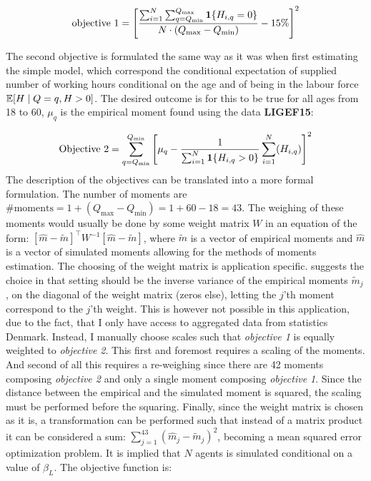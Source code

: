 \begin{equation}
    \text{objective 1} = \left[\frac{\sum_{i=1}^{N} \sum_{q=Q_{\min}}^{Q_{\max}} \mathbf{1}\{H_{i,q} = 0\}}{ N \cdot (Q_{\max} - Q_{\min} )} - 15\% \right]^2
\end{equation}

The second objective is formulated the same way as it was when first estimating the simple model, which correspond the conditional expectation of supplied number of working hours conditional on the age and of being in the labour force $ \mathbb{E}[H \mid Q=q, H>0]$. The desired outcome is for this to be true for all ages from 18 to 60, $\mu_q$ is the empirical moment found using the data \textbf{LIGEF15}:

\begin{equation}
    \text{Objective 2} = \sum_{q=Q_{\min}}^{Q_{\min}} \left[ \mu_q  - \frac{1}{\sum_{i=1}^{N} \mathbf{1}\{H_{i,q} > 0\}}\sum_{i=1}^N (H_{i,q})\right]^2
\end{equation}
The description of the objectives can be translated into a more formal formulation. The number of moments are $\text{\# moments}  = 1 + (Q_{\max} - Q_{\min}) = 1 + 60 - 18 = 43$. The weighing of these moments would usually be done by some weight matrix $W$ in an equation of the form: $[\hat{m} - \tilde{m}]^{\top} W^{-1} [\hat{m} - \tilde{m}]$, where $\tilde{m}$ is a vector of empirical moments and $\hat{m}$ is a vector of simulated moments allowing for the methods of moments estimation. The choosing of the weight matrix is application specific. \textcite{eisenhauer_estimation_2015} suggests the choice in that setting should be the inverse variance of the empirical moments $\tilde{m}_j$, on the diagonal of the weight matrix (zeros else), letting the $j$'th moment correspond to the $j$'th weight. This is however not possible in this application, due to the fact, that I only have access to aggregated data from statistics Denmark. Instead, I manually choose scales such that \textit{objective 1} is equally weighted to \textit{objective 2}. This first and foremost requires a scaling of the moments. And second of all this requires a re-weighing since there are 42 moments composing \textit{objective 2} and only a single moment composing \textit{objective 1}. Since the distance between the empirical and the simulated moment is squared, the scaling must be performed before the squaring. Finally, since the weight matrix is chosen as it is, a transformation can be performed such that instead of a matrix product it can be considered a sum: $\sum_{j = 1}
^{43} ( \hat{m}_j - \tilde{m}_j )^2$, becoming a mean squared error optimization problem. It is implied that $N$ agents is simulated conditional on a value of $\beta_L$. The objective function is:

